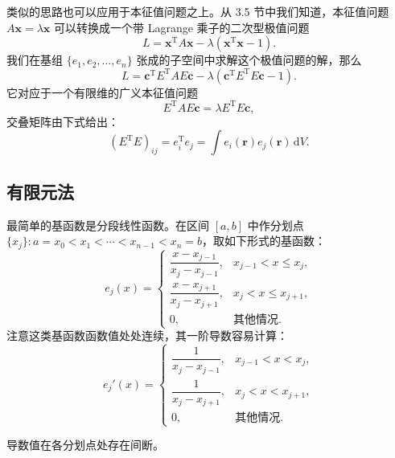类似的思路也可以应用于本征值问题之上。从 3.5 节中我们知道，本征值问题 $A\bm x=\lambda\bm x$ 可以转换成一个带 Lagrange 乘子的二次型极值问题
\begin{equation}
L=\bm x^{\mathrm T}A\bm x-\lambda(\bm x^{\mathrm T}\bm x-1).
\tag{5.4.15}
\end{equation}
我们在基组 $\{e_1,e_2,\ldots,e_n\}$ 张成的子空间中求解这个极值问题的解，那么
\begin{equation}
L=\bm c^{\mathrm T}E^{\mathrm T}AE\bm c-\lambda(\bm c^{\mathrm T}E^{\mathrm T}E\bm c-1).
\tag{5.4.16}
\end{equation}
它对应于一个有限维的广义本征值问题
\begin{equation}
E^{\mathrm T}AE\bm c=\lambda E^{\mathrm T}E\bm c,
\tag{5.4.17}
\end{equation}
交叠矩阵由下式给出：
\begin{equation}
(E^{\mathrm T}E)_{ij}=e_i^{\mathrm T}e_j=\int e_i(\bm r)e_j(\bm r)\,\mathrm dV.
\tag{5.4.18}
\end{equation}

\subsection{有限元法}

最简单的基函数是分段线性函数。在区间 $[a,b]$ 中作分划点 $\{x_j\}:a=x_0<x_1<\cdots<x_{n-1}<x_n=b$，取如下形式的基函数：
\begin{equation}
e_j(x)=
\begin{cases}
\dfrac{x-x_{j-1}}{x_j-x_{j-1}},&x_{j-1}<x\le x_j,\\[6pt]
\dfrac{x-x_{j+1}}{x_j-x_{j+1}},&x_j<x\le x_{j+1},\\[6pt]
0,&\text{其他情况}.
\end{cases}
\tag{5.4.19}
\end{equation}
注意这类基函数函数值处处连续，其一阶导数容易计算：
\begin{equation}
e_j'(x)=
\begin{cases}
\dfrac1{x_j-x_{j-1}},&x_{j-1}<x<x_j,\\[6pt]
\dfrac1{x_j-x_{j+1}},&x_j<x<x_{j+1},\\[6pt]
0,&\text{其他情况}.
\end{cases}
\tag{5.4.20}
\end{equation}

导数值在各分划点处存在间断。


